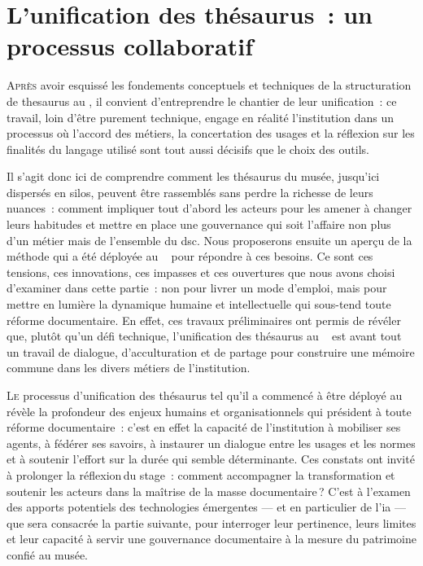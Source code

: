 \chapter[Un processus collaboratif]{\label{III-B} L'unification des thésaurus~: un processus collaboratif}


\lettrine{A}{près} avoir esquissé les fondements conceptuels et techniques de la structuration de \gls{thesaurus} au \mae, il convient d’entreprendre le chantier de leur unification~: ce travail, loin d'être purement technique, engage en réalité l’institution dans un processus où l’accord des métiers, la concertation des usages et la réflexion sur les finalités du langage utilisé sont tout aussi décisifs que le choix des outils.



Il s’agit donc ici de comprendre comment les thésaurus du musée, jusqu'ici dispersés en silos, peuvent être rassemblés sans perdre la richesse de leurs nuances~: comment impliquer tout d'abord les acteurs pour les amener à changer leurs habitudes et mettre en place une gouvernance qui soit l'affaire non plus d'un métier mais de l'ensemble du \ac{dsc}. Nous proposerons ensuite un aperçu de la méthode qui a été déployée au \mae~ pour répondre à ces besoins. Ce sont ces tensions, ces innovations, ces impasses et ces ouvertures que nous avons choisi d’examiner dans cette partie~: non pour livrer un mode d’emploi, mais pour mettre en lumière la dynamique humaine et intellectuelle qui sous-tend toute réforme documentaire. En effet, ces travaux préliminaires ont permis de révéler que, plutôt qu'un défi technique, l’unification des thésaurus au \mae~ est avant tout un travail de dialogue, d’acculturation et de partage pour construire une mémoire commune dans les divers métiers de l'institution.











\bigskip

\bigskip

\bigskip



\lettrine{L}{e} processus d’unification des thésaurus tel qu’il a commencé à être déployé au \mae~ révèle la profondeur des enjeux humains et organisationnels qui président à toute réforme documentaire~: c’est en effet la capacité de l’institution à mobiliser ses agents, à fédérer ses savoirs, à instaurer un dialogue entre les usages et les normes et à soutenir l’effort sur la durée qui semble déterminante. Ces constats ont invité à prolonger la réflexion du stage~: comment accompagner la transformation et soutenir les acteurs dans la maîtrise de la masse documentaire ? C’est à l’examen des apports potentiels des technologies émergentes — et en particulier de l’\acf{ia} — que sera consacrée la partie suivante, pour interroger leur pertinence, leurs limites et leur capacité à servir une gouvernance documentaire à la mesure du patrimoine confié au musée.